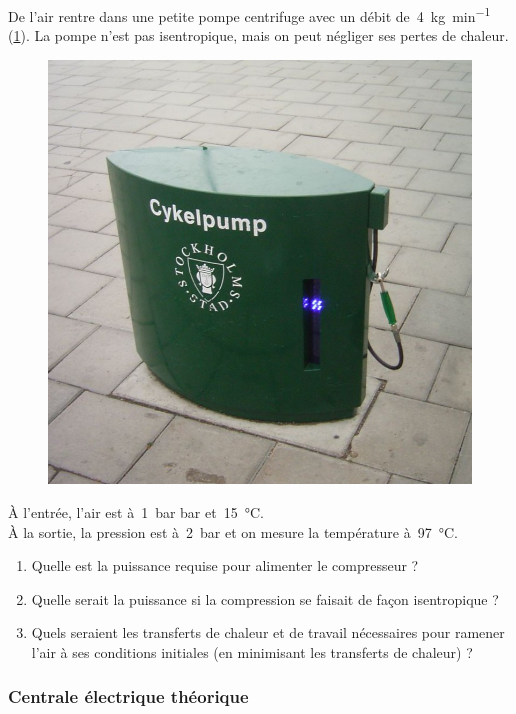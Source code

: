 	De l’air rentre dans une petite pompe centrifuge avec un débit de~\SI{4}{\kilogram\per\minute} (\cref{fig_pompe_stockholm}). La pompe n’est pas isentropique, mais on peut négliger ses pertes de chaleur.
	
	\begin{figure}[htp] %
		\begin{center}
			\includegraphics[width=0.6\columnwidth]{images/stockholm_pump.jpg}
		\end{center}
		\label{fig_pompe_stockholm}
	\end{figure}

	À l’entrée, l’air est à~\SI{1}{\bar} bar et~\SI{15}{\degreeCelsius}.\\
	À la sortie, la pression est à~\SI{2}{\bar} et on mesure la température à~\SI{97}{\degreeCelsius}.

	\begin{enumerate}
		\item Quelle est la puissance requise pour alimenter le compresseur ?
		\item Quelle serait la puissance si la compression se faisait de façon isentropique ?
		\item Quels seraient les transferts de chaleur et de travail nécessaires pour ramener l’air à ses conditions initiales (en minimisant les transferts de chaleur) ?
	\end{enumerate}

\subsubsection{Centrale électrique théorique}
\label{exo_cycle_carnot_vapeur}
	
